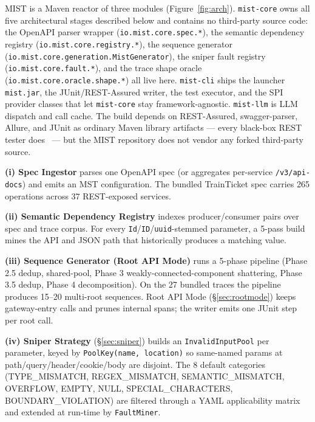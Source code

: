 \documentclass[10pt,conference]{IEEEtran}
\begin{document}
MIST is a Maven reactor of three modules (Figure~\ref{fig:arch}). \texttt{mist-core} owns all five architectural stages described below and contains no third-party source code: the OpenAPI parser wrapper (\texttt{io.mist.core.spec.*}), the semantic dependency registry (\texttt{io.mist.core.registry.*}), the sequence generator (\texttt{io.mist.core.generation.MistGenerator}), the sniper fault registry (\texttt{io.mist.core.fault.*}), and the trace shape oracle (\texttt{io.mist.core.oracle.shape.*}) all live here. \texttt{mist-cli} ships the launcher \texttt{mist.jar}, the JUnit/REST-Assured writer, the test executor, and the SPI provider classes that let \texttt{mist-core} stay framework-agnostic. \texttt{mist-llm} is LLM dispatch and call cache. The build depends on REST-Assured, swagger-parser, Allure, and JUnit as ordinary Maven library artifacts --- every black-box REST tester does~\cite{MartinLopez2021RESTest,Arcuri2019EvoMasterTOSEM,Atlidakis2019RESTler} --- but the MIST repository does not vendor any forked third-party source.

\textbf{(i) Spec Ingestor} parses one OpenAPI spec (or aggregates per-service \texttt{/v3/api-docs}) and emits an MST configuration. The bundled TrainTicket spec carries 265 operations across 37 REST-exposed services.

\textbf{(ii) Semantic Dependency Registry} indexes producer/consumer pairs over spec and trace corpus. For every \texttt{Id}/\texttt{ID}/\texttt{uuid}-stemmed parameter, a 5-pass build mines the API and JSON path that historically produces a matching value.

\textbf{(iii) Sequence Generator (Root API Mode)} runs a 5-phase pipeline (Phase 2.5 dedup, shared-pool, Phase 3 weakly-connected-component shattering, Phase 3.5 dedup, Phase 4 decomposition). On the 27 bundled traces the pipeline produces 15--20 multi-root sequences. Root API Mode (\S\ref{sec:rootmode}) keeps gateway-entry calls and prunes internal spans; the writer emits one JUnit step per root call.

\textbf{(iv) Sniper Strategy} (\S\ref{sec:sniper}) builds an \texttt{Invalid\-Input\-Pool} per parameter, keyed by \texttt{PoolKey(name, location)} so same-named params at path/query/header/cookie/body are disjoint. The 8 default categories (TYPE\_MISMATCH, REGEX\_\allowbreak MISMATCH, SEMANTIC\_MISMATCH, OVERFLOW, EMPTY, NULL, SPECIAL\_CHARACTERS, BOUNDARY\_VIOLATION) are filtered through a YAML applicability matrix and extended at run-time by \texttt{FaultMiner}.
\end{document}
